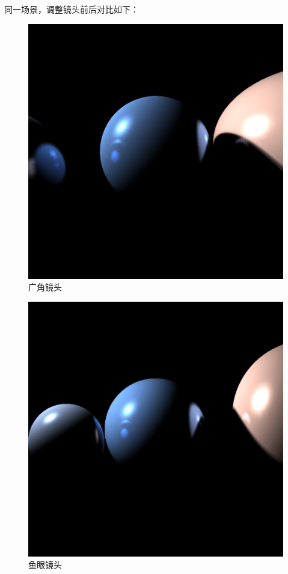 \documentclass[10pt,twocolumn]{article}
\begin{document}
同一场景，调整镜头前后对比如下：
\begin{figure}[ht]
\centering
\includegraphics[scale=.2]{fig7.jpg}
\caption{广角镜头}
\end{figure}
\begin{figure}[ht]
\centering
\includegraphics[scale=.2]{fig8.jpg}
\caption{鱼眼镜头}
\end{figure}
\end{document}
